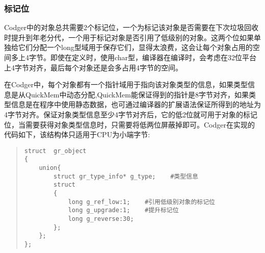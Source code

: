 \subsubsection{标记位}
Codger中的对象总共需要2个标记位，一个为标记该对象是否需要在下次垃圾回收时提升到年老分代，一个用于标记对象是否引用了低级别的对象。这两个位如果单独给它们分配一个long型域用于保存它们，显得太浪费，这会让每个对象占用的空间多上4字节。即使在定义时，使用char型，编译器在编译时，会考虑在32位平台上4字节对齐，最后每个对象还是会多占用4字节的空间。

在Codger中，每个对象都有一个指针域用于指向该对象类型的信息，如果类型信息是从QuickMem中动态分配,QuickMem能保证得到的指针是8字节对齐，如果类型信息是在程序中使用静态数据，也可通过编译器的扩展语法保证所得到的地址为4字节对齐。保证对象类型信息至少4字节对齐后，它的低2位就可用于对象的标记位，当需要获得对象类型信息时，只需要将低两位屏蔽掉即可。Codger在实现的代码如下，该结构体只适用于CPU为小端字节:
\begin{quote}
\begin{verbatim} 
struct  gr_object 
{
    union{
        struct gr_type_info* g_type;    #类型信息
        struct 
        {
            long g_ref_low:1;    #引用低级别对象的标记位
            long g_upgrade:1;    #提升标记位
            long g_reverse:30;
        };
    };
};
\end{verbatim}
\end{quote}

















